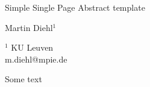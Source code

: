 \documentclass[a4paper]{article}
\begin{document}

\Large
 \begin{center}
Simple Single Page Abstract template\\ 

\hspace{10pt}

\large
Martin Diehl$^1$\\

\hspace{10pt}

\small  
$^1$ KU Leuven\\
m.diehl@mpie.de

\end{center}

\hspace{10pt}

\normalsize

Some text
\cite{Diehl2017}

\printbibliography 
\end{document}
